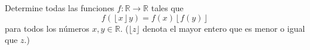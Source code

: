 Determine todas las funciones $f : \mathbb{R} \to \mathbb{R}$ tales que 
\[f(\left\lfloor x\right\rfloor y)=f(x)\left\lfloor f(y)\right\rfloor \]
para todos los números $x, y \in \mathbb{R}$. ($\lfloor z\rfloor$ denota el mayor entero que es menor o igual que $z$.)